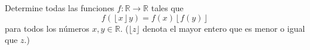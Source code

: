 Determine todas las funciones $f : \mathbb{R} \to \mathbb{R}$ tales que 
\[f(\left\lfloor x\right\rfloor y)=f(x)\left\lfloor f(y)\right\rfloor \]
para todos los números $x, y \in \mathbb{R}$. ($\lfloor z\rfloor$ denota el mayor entero que es menor o igual que $z$.)